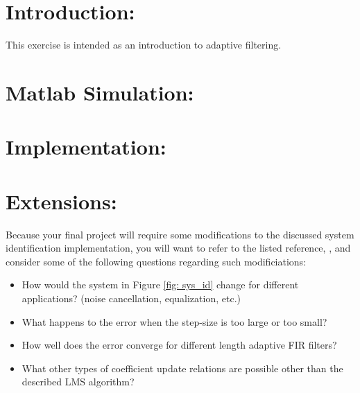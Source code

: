 \documentclass[11pt]{handout}
\begin{document}
\setlength{\baselineskip}{0.5cm}
\setlength{\parskip}{0.5cm}

\makeboxtitle
\vspace{0.3cm}

\section{Introduction:}

This exercise is intended as an introduction to adaptive
filtering.



\section{Matlab Simulation:}



\section{Implementation:}



\section{Extensions:}

Because your final project will require some modifications to 
the discussed system identification implementation, you
will want to refer to the listed reference, \cite{Haykin1}, 
and consider some of the following questions regarding 
such modificiations:

\begin{itemize}
\item{How would the system in Figure \ref{fig: sys_id} 
change for different applications? (noise cancellation,
equalization, etc.)}
\item{What happens to the error when the step-size is too 
large or too small?}
\item{How well does the error converge for different length 
adaptive FIR filters?}
\item{What other types of coefficient update relations are 
possible other than the described LMS algorithm?}
\end{itemize}




%
%
\end{document}
